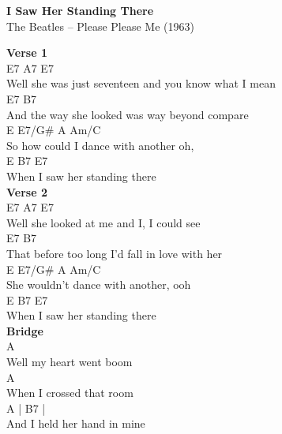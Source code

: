 \documentclass[a4paper]{article}
\begin{document}
    \begin{center}
        \textbf{I Saw Her Standing There}
        ~\\
        The Beatles -- Please Please Me (1963)
    \end{center}
    {
        \scriptsize
        \textbf{Verse 1}
        ~\\
        {
            \cutive
            \obeyspaces
             E7                     A7          E7
\\
Well she was just seventeen and you know what I mean
\\
        E7                               B7
\\
And the way she looked was way beyond compare
\\
   E           E7/G\#       A      Am/C
\\
So how could I dance with another oh,
\\
       E       B7       E7
\\
When I saw her standing there
\\

        }
        \textbf{Verse 2}
        ~\\
        {
            \cutive
            \obeyspaces
     E7                   A7         E7
\\
Well she looked at me and I, I could see
\\
       E7                                  B7
\\
That before too long I'd fall in love with her
\\
E            E7/G\#       A       Am/C
\\
She wouldn't dance with another, ooh
\\
       E       B7       E7
\\
When I saw her standing there
\\

        }
        \textbf{Bridge}
        ~\\
        {
            \cutive
            \obeyspaces
        A
\\
Well my heart went boom 
\\
       A
\\
When I crossed that room
\\
      A               | B7 | %
\\
And I held her hand in mine
\\

}}
\end{document}
